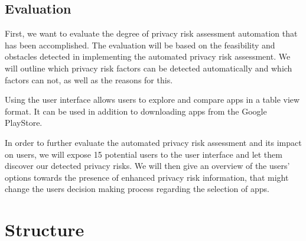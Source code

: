 \documentclass[
	a4paper,
	oneside,
	12pt,
	liststotocnumbered
]{article}
\let\cite\textcite
\begin{document}
\subsection{Evaluation}

First, we want to evaluate the degree of privacy risk assessment automation that has been accomplished. 
The evaluation will be based on the feasibility and obstacles detected in implementing the automated privacy risk assessment. We will outline which privacy risk factors can be detected automatically and which factors can not, as well as the reasons for this.

Using the \cite{Bruggemann2016} user interface allows users to explore and compare \mH apps in a table view format. 
It can be used in addition to downloading apps from the Google PlayStore.

In order to further evaluate the automated privacy risk assessment and its impact on users, we will expose 15 potential users to the user interface and let them discover our detected privacy risks.
We will then give an overview of the users' options towards the presence of enhanced privacy risk information, that might change the users decision making process regarding the selection of \mH apps.

\section{Structure}
\end{document}
